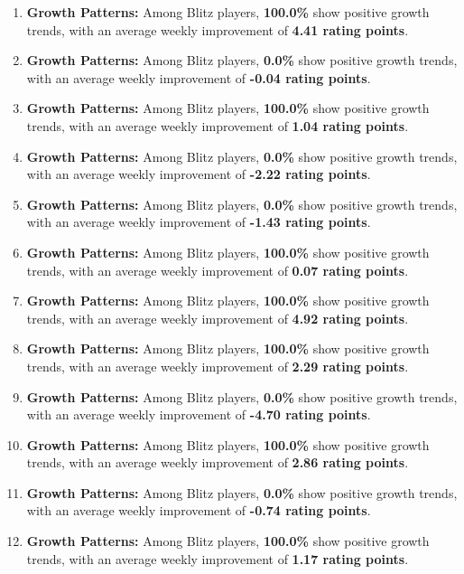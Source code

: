 \documentclass[
]{article}
\begin{document}
\begin{enumerate}
\def\labelenumi{\arabic{enumi}.}
\item
  \textbf{Growth Patterns:} Among Blitz players, \textbf{100.0\%} show
  positive growth trends, with an average weekly improvement of
  \textbf{4.41 rating points}.
\item
  \textbf{Growth Patterns:} Among Blitz players, \textbf{0.0\%} show
  positive growth trends, with an average weekly improvement of
  \textbf{-0.04 rating points}.
\item
  \textbf{Growth Patterns:} Among Blitz players, \textbf{100.0\%} show
  positive growth trends, with an average weekly improvement of
  \textbf{1.04 rating points}.
\item
  \textbf{Growth Patterns:} Among Blitz players, \textbf{0.0\%} show
  positive growth trends, with an average weekly improvement of
  \textbf{-2.22 rating points}.
\item
  \textbf{Growth Patterns:} Among Blitz players, \textbf{0.0\%} show
  positive growth trends, with an average weekly improvement of
  \textbf{-1.43 rating points}.
\item
  \textbf{Growth Patterns:} Among Blitz players, \textbf{100.0\%} show
  positive growth trends, with an average weekly improvement of
  \textbf{0.07 rating points}.
\item
  \textbf{Growth Patterns:} Among Blitz players, \textbf{100.0\%} show
  positive growth trends, with an average weekly improvement of
  \textbf{4.92 rating points}.
\item
  \textbf{Growth Patterns:} Among Blitz players, \textbf{100.0\%} show
  positive growth trends, with an average weekly improvement of
  \textbf{2.29 rating points}.
\item
  \textbf{Growth Patterns:} Among Blitz players, \textbf{0.0\%} show
  positive growth trends, with an average weekly improvement of
  \textbf{-4.70 rating points}.
\item
  \textbf{Growth Patterns:} Among Blitz players, \textbf{100.0\%} show
  positive growth trends, with an average weekly improvement of
  \textbf{2.86 rating points}.
\item
  \textbf{Growth Patterns:} Among Blitz players, \textbf{0.0\%} show
  positive growth trends, with an average weekly improvement of
  \textbf{-0.74 rating points}.
\item
  \textbf{Growth Patterns:} Among Blitz players, \textbf{100.0\%} show
  positive growth trends, with an average weekly improvement of
  \textbf{1.17 rating points}.

\end{enumerate}
\end{document}
